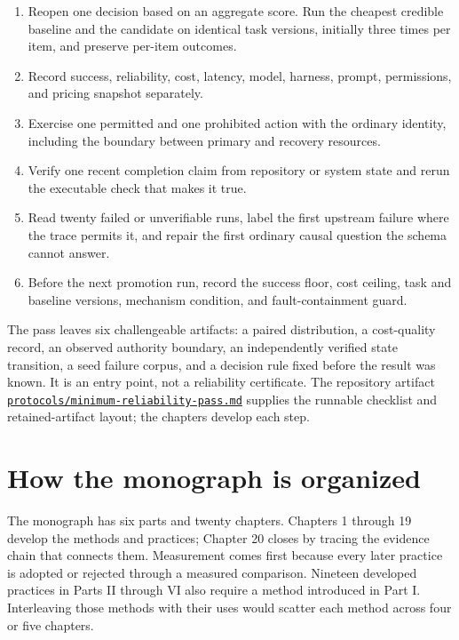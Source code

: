 \begin{enumerate}
\def\labelenumi{\arabic{enumi}.}
\tightlist
\item
  Reopen one decision based on an aggregate score. Run the cheapest credible baseline and the candidate on identical task versions, initially three times per item, and preserve per-item outcomes.
\item
  Record success, reliability, cost, latency, model, harness, prompt, permissions, and pricing snapshot separately.
\item
  Exercise one permitted and one prohibited action with the ordinary identity, including the boundary between primary and recovery resources.
\item
  Verify one recent completion claim from repository or system state and rerun the executable check that makes it true.
\item
  Read twenty failed or unverifiable runs, label the first upstream failure where the trace permits it, and repair the first ordinary causal question the schema cannot answer.
\item
  Before the next promotion run, record the success floor, cost ceiling, task and baseline versions, mechanism condition, and fault-containment guard.
\end{enumerate}

The pass leaves six challengeable artifacts: a paired distribution, a cost-quality record, an observed authority boundary, an independently verified state transition, a seed failure corpus, and a decision rule fixed before the result was known. It is an entry point, not a reliability certificate. The repository artifact \href{https://github.com/sjarmak/engineering-reliable-coding-agents/blob/main/protocols/minimum-reliability-pass.md}{\texttt{protocols/minimum-reliability-pass.md}} supplies the runnable checklist and retained-artifact layout; the chapters develop each step.

\hypertarget{how-the-monograph-is-organized}{%
\section{How the monograph is organized}\label{how-the-monograph-is-organized}}

The monograph has six parts and twenty chapters. Chapters 1 through 19 develop the methods and practices; Chapter 20 closes by tracing the evidence chain that connects them. Measurement comes first because every later practice is adopted or rejected through a measured comparison. Nineteen developed practices in Parts II through VI also require a method introduced in Part I. Interleaving those methods with their uses would scatter each method across four or five chapters.

